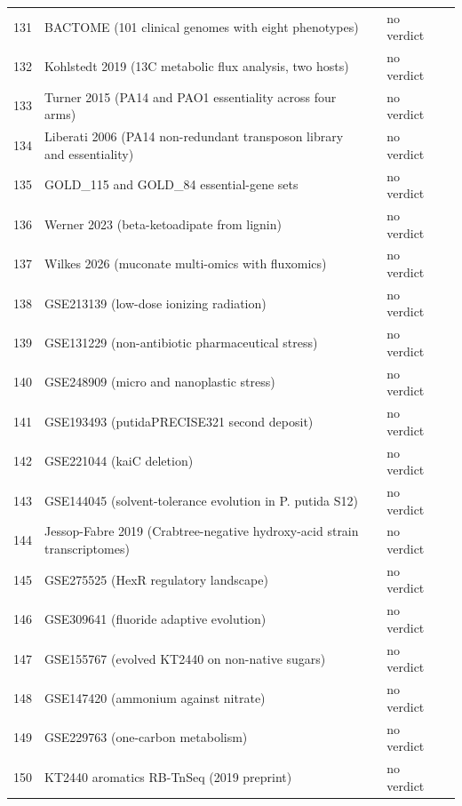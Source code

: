 \begin{longtable}{@{}r L{76mm} L{20mm} L{36mm} L{24mm}@{}}
131 & BACTOME (101 clinical genomes with eight phenotypes) &  & no verdict &  \\
132 & Kohlstedt 2019 (13C metabolic flux analysis, two hosts) &  & no verdict &  \\
133 & Turner 2015 (PA14 and PAO1 essentiality across four arms) &  & no verdict &  \\
134 & Liberati 2006 (PA14 non-redundant transposon library and essentiality) &  & no verdict &  \\
135 & GOLD\_115 and GOLD\_84 essential-gene sets &  & no verdict &  \\
136 & Werner 2023 (beta-ketoadipate from lignin) &  & no verdict &  \\
137 & Wilkes 2026 (muconate multi-omics with fluxomics) &  & no verdict &  \\
138 & GSE213139 (low-dose ionizing radiation) &  & no verdict &  \\
139 & GSE131229 (non-antibiotic pharmaceutical stress) &  & no verdict &  \\
140 & GSE248909 (micro and nanoplastic stress) &  & no verdict &  \\
141 & GSE193493 (putidaPRECISE321 second deposit) &  & no verdict &  \\
142 & GSE221044 (kaiC deletion) &  & no verdict &  \\
143 & GSE144045 (solvent-tolerance evolution in P. putida S12) &  & no verdict &  \\
144 & Jessop-Fabre 2019 (Crabtree-negative hydroxy-acid strain transcriptomes) &  & no verdict &  \\
145 & GSE275525 (HexR regulatory landscape) &  & no verdict &  \\
146 & GSE309641 (fluoride adaptive evolution) &  & no verdict &  \\
147 & GSE155767 (evolved KT2440 on non-native sugars) &  & no verdict &  \\
148 & GSE147420 (ammonium against nitrate) &  & no verdict &  \\
149 & GSE229763 (one-carbon metabolism) &  & no verdict &  \\
150 & KT2440 aromatics RB-TnSeq (2019 preprint) &  & no verdict &  \\

\end{longtable}
